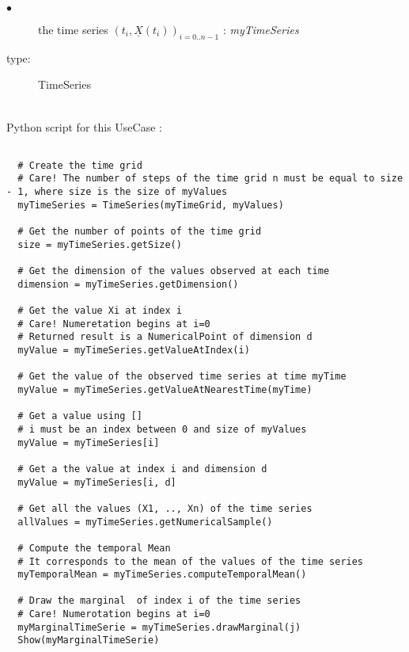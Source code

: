 {
  \begin{description}
  \item[$\bullet$] the time series $(t_i, \underline{X}(t_i))_{i=0 ..n-1}$ : {\itshape myTimeSeries}
  \item[type:]  TimeSeries
  \end{description}
}

\textspace\\
Python script for this UseCase :

\begin{lstlisting}

  # Create the time grid 
  # Care! The number of steps of the time grid n must be equal to size - 1, where size is the size of myValues 
  myTimeSeries = TimeSeries(myTimeGrid, myValues)
  
  # Get the number of points of the time grid
  size = myTimeSeries.getSize()

  # Get the dimension of the values observed at each time
  dimension = myTimeSeries.getDimension()

  # Get the value Xi at index i
  # Care! Numeretation begins at i=0
  # Returned result is a NumericalPoint of dimension d
  myValue = myTimeSeries.getValueAtIndex(i)

  # Get the value of the observed time series at time myTime 
  myValue = myTimeSeries.getValueAtNearestTime(myTime)

  # Get a value using []
  # i must be an index between 0 and size of myValues 
  myValue = myTimeSeries[i]

  # Get a the value at index i and dimension d
  myValue = myTimeSeries[i, d]

  # Get all the values (X1, .., Xn) of the time series
  allValues = myTimeSeries.getNumericalSample()

  # Compute the temporal Mean
  # It corresponds to the mean of the values of the time series
  myTemporalMean = myTimeSeries.computeTemporalMean()
   
  # Draw the marginal  of index i of the time series
  # Care! Numerotation begins at i=0
  myMarginalTimeSerie = myTimeSeries.drawMarginal(j)
  Show(myMarginalTimeSerie)

\end{lstlisting}
